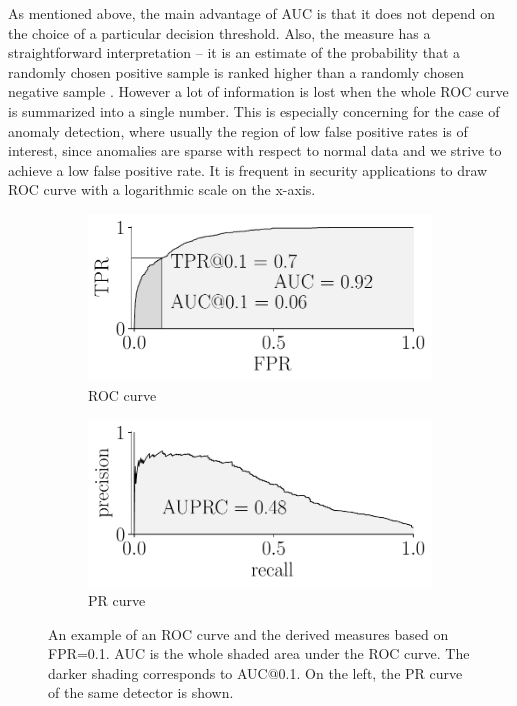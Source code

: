 As mentioned above, the main advantage of AUC is that it does not depend on the choice of a particular decision threshold. Also, the measure has a straightforward interpretation -- it is an estimate of the probability that a randomly chosen positive sample is ranked higher than a randomly chosen negative sample \cite{hand2001simple}. However a lot of information is lost when the whole ROC curve is summarized into a single number. This is especially concerning for the case of anomaly detection, where usually the region of low false positive rates is of interest, since anomalies are sparse with respect to normal data and we strive to achieve a low false positive rate. It is frequent in security applications to draw ROC curve with a logarithmic scale on the x-axis.

\begin{figure}
\centering
\begin{subfigure}[b]{0.45\textwidth} 
	\centering
	\includegraphics[width=\textwidth]{data/chapter_intro/roc_example.pdf}
	\caption{ROC curve}
	\label{fig:roc_example}
\end{subfigure}
\hfill
\begin{subfigure}[b]{0.45\textwidth}
	\centering
	\includegraphics[width=\textwidth]{data/chapter_intro/prc_example.pdf}
	\caption{PR curve}
	 \label{fig:prc_example}
\end{subfigure}

\caption{An example of an ROC curve and the derived measures based on FPR=0.1. AUC is the whole shaded area under the ROC curve. The darker shading corresponds to AUC@0.1. On the left, the PR curve of the same detector is shown.}
\label{fig:ROC}
\end{figure}

